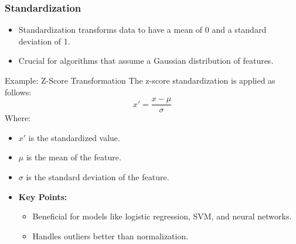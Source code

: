 \documentclass[aspectratio=169]{beamer}
\begin{document}
\begin{frame}[fragile]
    \frametitle{Standardization}
    \begin{itemize}
        \item Standardization transforms data to have a mean of 0 and a standard deviation of 1.
        \item Crucial for algorithms that assume a Gaussian distribution of features.
    \end{itemize}
    
    \begin{block}{Example: Z-Score Transformation}
        The z-score standardization is applied as follows:
        \begin{equation}
            x' = \frac{x - \mu}{\sigma}
        \end{equation}
        Where:
        \begin{itemize}
            \item \( x' \) is the standardized value.
            \item \( \mu \) is the mean of the feature.
            \item \( \sigma \) is the standard deviation of the feature.
        \end{itemize}
    \end{block}
    
    \begin{itemize}
        \item \textbf{Key Points:}
        \begin{itemize}
            \item Beneficial for models like logistic regression, SVM, and neural networks.
            \item Handles outliers better than normalization.
        \end{itemize}
    \end{itemize}
\end{frame}
\end{document}
